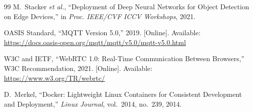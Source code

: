 \documentclass[12pt,a4paper]{report}
\begin{document}
\begin{thebibliography}{99}
M.~Stacker \textit{et al.},
``Deployment of Deep Neural Networks for Object Detection on Edge Devices,''
in \textit{Proc. IEEE/CVF ICCV Workshops}, 2021.

OASIS Standard,
``MQTT Version 5.0,'' 2019.
[Online]. Available: \url{https://docs.oasis-open.org/mqtt/mqtt/v5.0/mqtt-v5.0.html}

W3C and IETF,
``WebRTC 1.0: Real-Time Communication Between Browsers,''
W3C Recommendation, 2021.
[Online]. Available: \url{https://www.w3.org/TR/webrtc/}

D.~Merkel,
``Docker: Lightweight Linux Containers for Consistent Development and Deployment,''
\textit{Linux Journal}, vol.~2014, no.~239, 2014.

\end{thebibliography}
\end{document}
